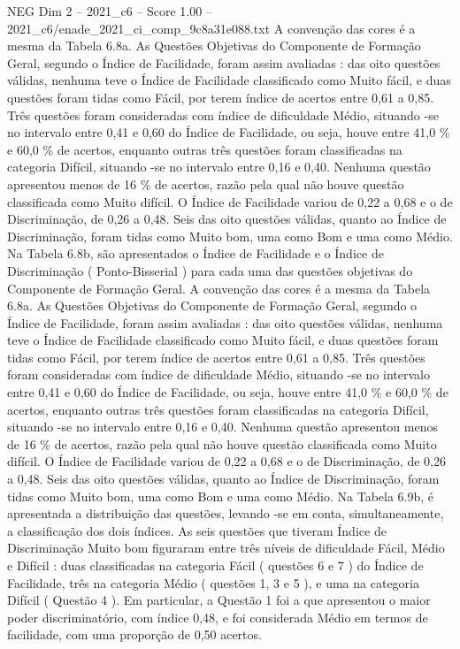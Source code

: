 \begin{textsample}{NEG Dim 2 – 2021\_c6 – Score 1.00 – 2021\_c6/enade\_2021\_ci\_comp\_9c8a31e088.txt}
A convenção das cores é a mesma da Tabela 6.8a.
As Questões Objetivas do Componente de Formação Geral, segundo o Índice de Facilidade, foram assim avaliadas : das oito questões válidas, nenhuma teve o Índice de Facilidade classificado como Muito fácil, e duas questões foram tidas como Fácil, por terem índice de acertos entre 0,61 a 0,85.
Três questões foram consideradas com índice de dificuldade Médio, situando -se no intervalo entre 0,41 e 0,60 do Índice de Facilidade, ou seja, houve entre 41,0 \% e 60,0 \% de acertos, enquanto outras três questões foram classificadas na categoria Difícil, situando -se no intervalo entre 0,16 e 0,40.
Nenhuma questão apresentou menos de 16 \% de acertos, razão pela qual não houve questão classificada como Muito difícil.
O Índice de Facilidade variou de 0,22 a 0,68 e o de Discriminação, de 0,26 a 0,48.
Seis das oito questões válidas, quanto ao Índice de Discriminação, foram tidas como Muito bom, uma como Bom e uma como Médio.
Na Tabela 6.8b, são apresentados o Índice de Facilidade e o Índice de Discriminação ( Ponto-Bisserial ) para cada uma das questões objetivas do Componente de Formação Geral.
A convenção das cores é a mesma da Tabela 6.8a.
As Questões Objetivas do Componente de Formação Geral, segundo o Índice de Facilidade, foram assim avaliadas : das oito questões válidas, nenhuma teve o Índice de Facilidade classificado como Muito fácil, e duas questões foram tidas como Fácil, por terem índice de acertos entre 0,61 a 0,85.
Três questões foram consideradas com índice de dificuldade Médio, situando -se no intervalo entre 0,41 e 0,60 do Índice de Facilidade, ou seja, houve entre 41,0 \% e 60,0 \% de acertos, enquanto outras três questões foram classificadas na categoria Difícil, situando -se no intervalo entre 0,16 e 0,40.
Nenhuma questão apresentou menos de 16 \% de acertos, razão pela qual não houve questão classificada como Muito difícil.
O Índice de Facilidade variou de 0,22 a 0,68 e o de Discriminação, de 0,26 a 0,48.
Seis das oito questões válidas, quanto ao Índice de Discriminação, foram tidas como Muito bom, uma como Bom e uma como Médio.
Na Tabela 6.9b, é apresentada a distribuição das questões, levando -se em conta, simultaneamente, a classificação dos dois índices.
As seis questões que tiveram Índice de Discriminação Muito bom figuraram entre três níveis de dificuldade Fácil, Médio e Difícil : duas classificadas na categoria Fácil ( questões 6 e 7 ) do Índice de Facilidade, três na categoria Médio ( questões 1, 3 e 5 ), e uma na categoria Difícil ( Questão 4 ).
Em particular, a Questão 1 foi a que apresentou o maior poder discriminatório, com índice 0,48, e foi considerada Médio em termos de facilidade, com uma proporção de 0,50 acertos.

\end{textsample}
